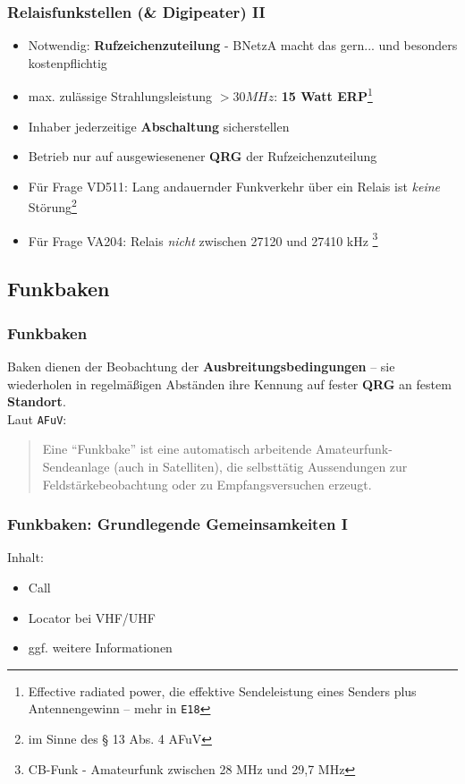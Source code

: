 \begin{frame}
  \frametitle{Relaisfunkstellen (\& Digipeater) II}

  \begin{itemize}[<+->]
    \item Notwendig: \textbf{Rufzeichenzuteilung} - BNetzA macht das gern...
      und besonders kostenpflichtig
    \item max. zulässige Strahlungsleistung $>30 MHz$: \textbf{15 Watt
      ERP}\footnote{Effective radiated power, die effektive
      Sendeleistung eines Senders plus Antennengewinn -- mehr in
      \texttt{E18}}
    \item Inhaber jederzeitige \textbf{Abschaltung} sicherstellen
    \item Betrieb nur auf ausgewiesenener \textbf{QRG} der Rufzeichenzuteilung
    \item Für Frage VD511: Lang andauernder Funkverkehr über ein Relais
      ist \emph{keine} Störung\footnote{im Sinne des § 13 Abs. 4 AFuV}
    \item Für Frage VA204: Relais \emph{nicht} zwischen 27120 und 27410 kHz
      \footnote{CB-Funk - Amateurfunk zwischen 28 MHz und 29,7 MHz}
  \end{itemize}

\end{frame}

\subsection{Funkbaken}

\begin{frame}
  \frametitle{Funkbaken}

  Baken dienen der Beobachtung der \textbf{Ausbreitungsbedingungen} -- sie
  wiederholen in regelmäßigen Abständen ihre Kennung auf fester \textbf{QRG}
  an festem \textbf{Standort}. \\[2em]

  Laut \texttt{AFuV}:
  \begin{quote}
    Eine ``Funkbake'' ist eine automatisch arbeitende Amateurfunk-Sendeanlage
    (auch in Satelliten), die selbsttätig Aussendungen zur
    Feldstärkebeobachtung oder zu Empfangsversuchen erzeugt.
  \end{quote}

\end{frame}

\begin{frame}
  \frametitle{Funkbaken: Grundlegende Gemeinsamkeiten I}

  Inhalt:

  \begin{itemize}
    \item Call
    \item Locator bei VHF/UHF
    \item ggf. weitere Informationen
  \end{itemize}

\end{frame}

